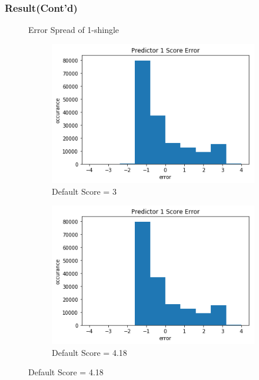\documentclass[11pt]{beamer}
\begin{document}
\begin{frame}
\frametitle{Result(Cont'd)}

\begin{figure}[h!]
  \centering
  Error Spread of 1-shingle\\
  \begin{subfigure}[b]{0.45\textwidth}
    \caption{Default Score = 3}
    \includegraphics[width=\linewidth]{predictor_1_error_3}
  \end{subfigure}
  \begin{subfigure}[b]{0.45\textwidth}
    \caption{Default Score = 4.18}
    \includegraphics[width=\linewidth]{predictor_1_error_train_mean}
  \end{subfigure}
\end{figure}

\end{frame}
\end{document}
